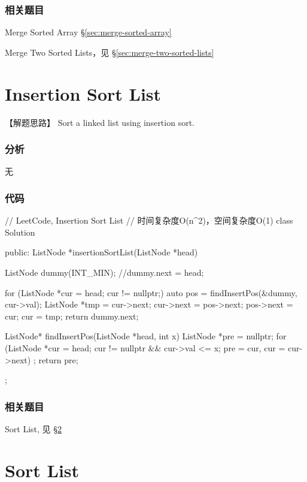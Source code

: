 \subsubsection{相关题目}
\begindot
\item Merge Sorted Array \S \ref{sec:merge-sorted-array}
\item Merge Two Sorted Lists，见 \S \ref{sec:merge-two-sorted-lists}
\myenddot


\section{Insertion Sort List} %
\label{sec:Insertion-Sort-List}


【解题思路】
Sort a linked list using insertion sort.


\subsubsection{分析}
无


\subsubsection{代码}
\begin{Code}
	// LeetCode, Insertion Sort List
	// 时间复杂度O(n^2)，空间复杂度O(1)
	class Solution {
		public:
		ListNode *insertionSortList(ListNode *head) {
			ListNode dummy(INT_MIN);
			//dummy.next = head;
			
			for (ListNode *cur = head; cur != nullptr;) {
				auto pos = findInsertPos(&dummy, cur->val);
				ListNode *tmp = cur->next;
				cur->next = pos->next;
				pos->next = cur;
				cur = tmp;
			}
			return dummy.next;
		}
		
		ListNode* findInsertPos(ListNode *head, int x) {
			ListNode *pre = nullptr;
			for (ListNode *cur = head; cur != nullptr && cur->val <= x;
			pre = cur, cur = cur->next)
			;
			return pre;
		}
	};
\end{Code}


\subsubsection{相关题目}
\begindot
\item Sort List, 见 \S \ref{sec:Sort-List}
\myenddot


\section{Sort List} %
\label{sec:Sort-List}


